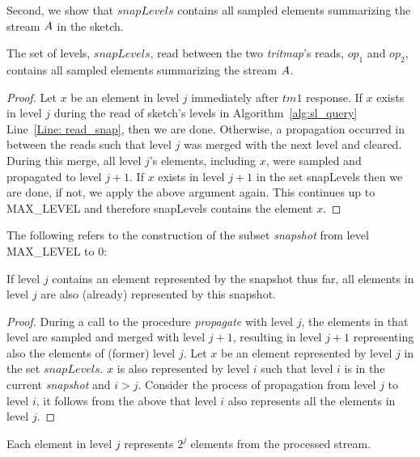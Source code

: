 Second, we show that $snapLevels$ contains all sampled elements summarizing the stream $\mathnormal{A}$ in the sketch.


\begin{lemma}\label{Lem: snap_no_miss}
The set of levels, $snapLevels$, read between the two \emph{tritmap}'s reads, $op_1$ and $op_2$, contains all sampled elements summarizing the stream $\mathnormal{A}$.
\end{lemma}
\begin{proof}
Let $x$ be an element in level $j$ immediately after $tm1$ response.
If $x$ exists in level $j$ during the read of sketch's levels in Algorithm~\ref{alg:sl_query} Line~\ref{Line: read_snap}, then we are done.
Otherwise, a propagation occurred in between the reads such that level $j$ was merged with the next level and cleared. During this merge, all level $j$'s elements, including $x$, were sampled and propagated to level $j+1$. If $x$ exists in level $j+1$ in the set 
snapLevels then we are done, if not, we apply the above argument again. This continues up to MAX\_LEVEL and therefore snapLevels contains the element $x$.
\end{proof}

The following refers to the construction of the subset \emph{snapshot} from level MAX\_LEVEL to 0:

\begin{lemma} \label{Lem: all_dup}
If level $j$ contains an element represented by the snapshot thus far, all elements in level $j$ are also (already) represented by this snapshot.
\end{lemma}
\begin{proof}
During a call to the procedure \emph{propagate} with level $j$, the elements in that level are sampled and merged with level $j+1$, resulting in level $j+1$ representing also the elements of (former) level $j$.
Let $x$ be an element represented by level $j$ in the set $snapLevels$.
$x$ is also represented by level $i$ such that level $i$ is in the current \emph{snapshot} and $i>j$. Consider the process of propagation from level $j$ to level $i$, it follows from the above that level $i$ also represents all the elements in level $j$.
\end{proof}

Each element in level $j$ represents $2^j$ elements from the processed stream.

